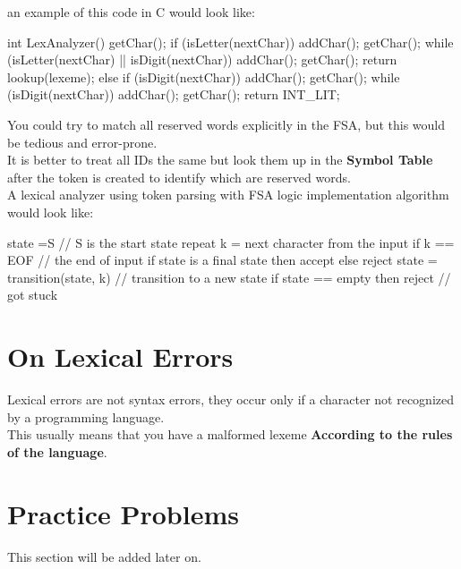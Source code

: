 an example of this code in C would look like:

\begin{cppcode}
    int LexAnalyzer() {
        getChar();
        if (isLetter(nextChar)) {
            addChar();
            getChar();
            while (isLetter(nextChar) || isDigit(nextChar)) {
                addChar();
                getChar();
            }
            return lookup(lexeme);
        }
        else if (isDigit(nextChar)) {
            addChar();
            getChar();
            while (isDigit(nextChar)) {
                addChar();
                getChar();
            }
            return INT_LIT;
        }
    }
\end{cppcode}

You could try to match all reserved words explicitly in the FSA, but this would be tedious and error-prone.\\
It is better to treat all IDs the same but look them up in the \textbf{Symbol Table} after the token is created to identify which are reserved words.\\ 

A lexical analyzer using token parsing with FSA logic implementation algorithm would look like:

\begin{commandshell}
    state =S // S is the start state
    repeat {
        k = next character from the input
        if k == EOF                     // the end of input
            if state is a final state
                then accept
                else reject
        state = transition(state, k)    // transition to a new state
        if state == empty
            then reject                 // got stuck
        }
\end{commandshell}

\section{On Lexical Errors}
Lexical errors are not syntax errors,  they occur only if a character not recognized by a programming language.\\
This usually means that you have a malformed lexeme \textbf{According to the rules of the language}.\\

\section{Practice Problems}
This section will be added later on.
